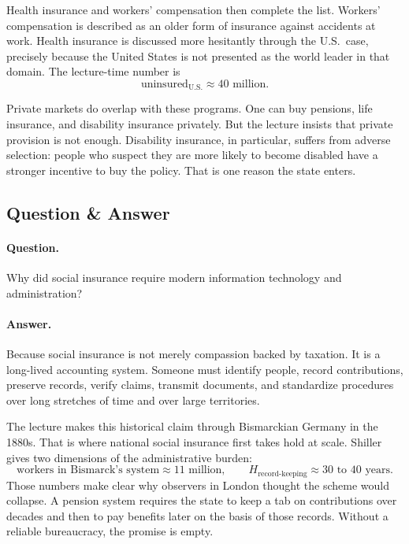 Health insurance and workers' compensation then complete the list. Workers' compensation is described as an older form of insurance against accidents at work. Health insurance is discussed more hesitantly through the U.S.\ case, precisely because the United States is not presented as the world leader in that domain. The lecture-time number is
\begin{equation}
\text{uninsured}_{\text{U.S.}} \approx 40\text{ million}.
\end{equation}

Private markets do overlap with these programs. One can buy pensions, life insurance, and disability insurance privately. But the lecture insists that private provision is not enough. Disability insurance, in particular, suffers from adverse selection: people who suspect they are more likely to become disabled have a stronger incentive to buy the policy. That is one reason the state enters.

\subsection{Question \& Answer}

\paragraph{Question.} Why did social insurance require modern information technology and administration?

\paragraph{Answer.} Because social insurance is not merely compassion backed by taxation. It is a long-lived accounting system. Someone must identify people, record contributions, preserve records, verify claims, transmit documents, and standardize procedures over long stretches of time and over large territories.

The lecture makes this historical claim through Bismarckian Germany in the 1880s. That is where national social insurance first takes hold at scale. Shiller gives two dimensions of the administrative burden:
\begin{equation}
\text{workers in Bismarck's system} \approx 11\text{ million},
\qquad
H_{\text{record-keeping}} \approx 30\text{ to }40\text{ years}.
\end{equation}
Those numbers make clear why observers in London thought the scheme would collapse. A pension system requires the state to keep a tab on contributions over decades and then to pay benefits later on the basis of those records. Without a reliable bureaucracy, the promise is empty.

